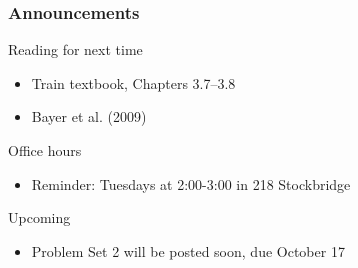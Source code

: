 \documentclass{beamer}
\begin{document}
\begin{frame}\frametitle{Announcements}
    Reading for next time
    \begin{itemize}
        \item Train textbook, Chapters 3.7--3.8
        \item Bayer et al. (2009)
    \end{itemize}
    \vspace{3ex}
    Office hours
    \begin{itemize}
        \item Reminder: Tuesdays at 2:00-3:00 in 218 Stockbridge
    \end{itemize}
    \vspace{3ex}
    Upcoming
    \begin{itemize}
        \item Problem Set 2 will be posted soon, due October 17
    \end{itemize}
\end{frame}
\end{document}
